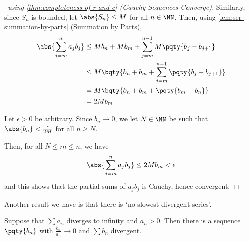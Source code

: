 \begin{proof}[\proofname\ using \autoref{thm:completeness-of-r-and-c} (Cauchy Sequences Converge)]
    Similarly, since \(S_n\) is bounded, let \(\abs{S_n} \leq M\) for all \(n \in \NN\). Then, using \autoref{lem:ser-summation-by-parts} (Summation by Parts),
    \begin{align*}
        \abs{\sum_{j = m}^{n} a_j b_j} &\leq M b_n + M b_m + \sum_{j = m}^{n - 1} M \pqty{b_j - b_{j + 1}} \\
        &\leq M \bqty{b_n + b_m + \sum_{j = m}^{n - 1} \pqty{b_j - b_{j + 1}}} \\
        &= M \bqty{b_n + b_m + \pqty{b_m - b_n}} \\
        &= 2 M b_m.
    \end{align*}

    Let \(\epsilon > 0\) be arbitrary. Since \(b_n \to 0\), we let \(N \in \NN\) be such that \(\abs{b_n} < \frac{\epsilon}{2M}\) for all \(n \geq N\).
    
    Then, for all \(N \leq m \leq n\), we have
    \[
        \abs{\sum_{j = m}^{n} a_j b_j} \leq 2 M b_m < \epsilon
    \]
    and this shows that the partial sums of \(a_j b_j\) is Cauchy, hence convergent.
\end{proof}

Another result we have is that there is `no slowest divergent series'.

\begin{lemma}
    \label{lem:no-slowest-divergent-series}%
    Suppose that \(\sum a_n\) diverges to infinity and \(a_n > 0\). Then there is a sequence \(\pqty{b_n}\) with \(\frac{b_n}{a_n} \to 0\) and \(\sum b_n\) divergent.
\end{lemma}

